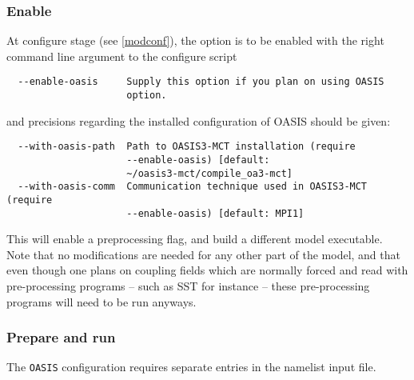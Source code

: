 \subsubsection{Enable}

At configure stage (see \ref{modconf}), the option is to be enabled with the
right command line argument to the configure script

\begin{verbatim}
  --enable-oasis     Supply this option if you plan on using OASIS
                     option.
\end{verbatim}

\noindent and precisions regarding the installed configuration of OASIS should
be given:

\begin{verbatim}
  --with-oasis-path  Path to OASIS3-MCT installation (require
                     --enable-oasis) [default:
                     ~/oasis3-mct/compile_oa3-mct]
  --with-oasis-comm  Communication technique used in OASIS3-MCT (require
                     --enable-oasis) [default: MPI1]
\end{verbatim}

This will enable a preprocessing flag, and build a different model executable.
Note that no modifications are needed for any other part of the model, and that
even though one plans on coupling fields which are normally forced and read
with pre-processing programs -- such as SST for instance -- these pre-processing
programs will need to be run anyways.

\subsubsection{Prepare and run}
\label{oasisrun}

The \verb=OASIS= configuration requires separate entries in the namelist input
file.

